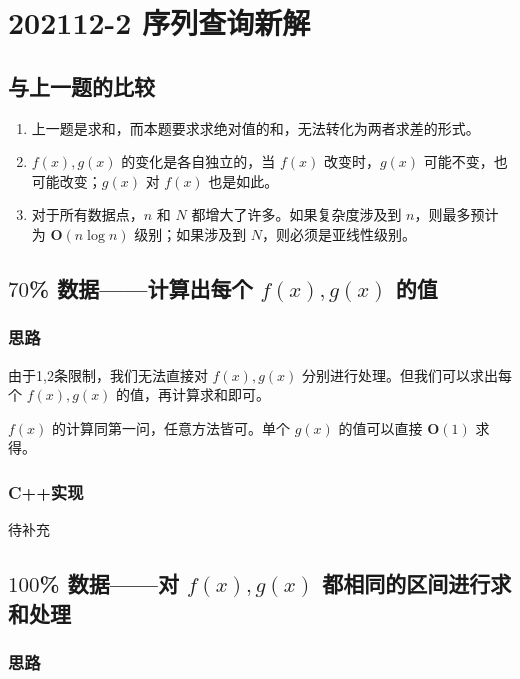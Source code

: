 \section{202112-2 序列查询新解}



\subsection{与上一题的比较}

\begin{enumerate}
    \item 上一题是求和，而本题要求求绝对值的和，无法转化为两者求差的形式。
    \item $f(x),g(x)$ 的变化是各自独立的，当 $f(x)$ 改变时，$g(x)$ 可能不变，也可能改变；$g(x)$ 对 $f(x)$ 也是如此。
    \item 对于所有数据点，$n$ 和 $N$ 都增大了许多。如果复杂度涉及到 $n$，则最多预计为 $\mathbf{O}(n\log n)$ 级别；如果涉及到 $N$，则必须是亚线性级别。
\end{enumerate}

\subsection{$70$\% 数据——计算出每个 $f(x),g(x)$ 的值}

\subsubsection{思路}

由于1,2条限制，我们无法直接对 $f(x),g(x)$ 分别进行处理。但我们可以求出每个 $f(x),g(x)$ 的值，再计算求和即可。

$f(x)$ 的计算同第一问，任意方法皆可。单个 $g(x)$ 的值可以直接 $\mathbf{O}(1)$ 求得。

\subsubsection{C++实现}

待补充

\subsection{$100$\% 数据——对 $f(x),g(x)$ 都相同的区间进行求和处理}

\subsubsection{思路}

